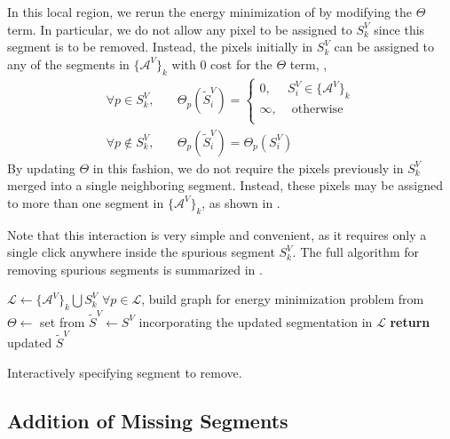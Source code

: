 \documentclass[]{spie}  %
\begin{document}
In this local region, we rerun the energy minimization of 
by modifying the $\Theta$ term.  In particular, we do not allow any
pixel to be assigned to $S^V_k$ since this segment is to be removed.
Instead, the pixels initially in $S^V_k$ can be assigned to any of the
segments in $\{\mathcal{A}^V\}_k$ with $0$ cost for the $\Theta$ term,
\ie,
\begin{equation}\label{eq:remove}
\begin{aligned}
 \forall p \in S^V_k ,& \quad \Theta_p(\tilde{S}^V_i) = \left\{
   \begin{array}{lcr}
     0, & S^V_i \in \{\mathcal{A}^V\}_k  \\
     \infty, & \textrm{ otherwise} \\
   \end{array}
 \right. \\
\forall p \notin S^V_k ,& \quad \Theta_p(\tilde{S}^V_i) = \Theta_p(S^V_i)
\end{aligned}
\end{equation}
By updating $\Theta$ in this fashion, we do not require the pixels
previously in $S^V_k$ merged into a single neighboring segment.
Instead, these pixels may be assigned to more than one segment in
$\{\mathcal{A}^V\}_k$, as shown in .

Note that this interaction is very simple and convenient, as it
requires only a single click anywhere inside the spurious segment
$S^V_k$.  The full algorithm for removing spurious segments is
summarized in .
\begin{algorithm}[!t]
  \centering
  \algrenewcommand{}
  \begin{algorithmic}[1]
    \State $\mathcal{L} \gets \{\mathcal{A}^V\}_k \bigcup S^V_k$
    \State $\forall p \in \mathcal{L}$, build graph for energy minimization problem from~\cite{waggoner:11}
    \State $\Theta \gets $ set from 
    \State $\tilde{S}^V \gets S^V$ incorporating the updated segmentation in $\mathcal{L}$
    \State \textbf{return} updated $\tilde{S}^V$
    \EndFunction
  \end{algorithmic}
  \caption{Interactively specifying segment to remove.}
  \label{alg:remove}
\end{algorithm}

\subsection{Addition of Missing Segments}
\label{sec:addition}
\end{document}

